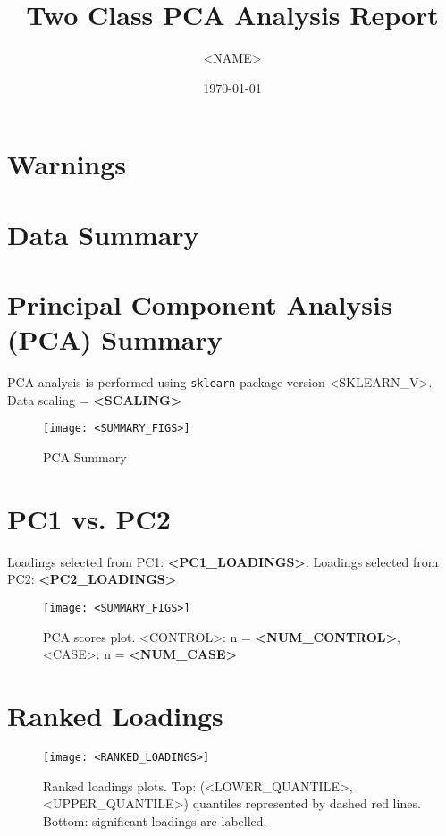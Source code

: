 \documentclass[]{article}
\title{Two Class PCA Analysis Report}
\author{<NAME>}
\date{\today}
\begin{document}
\begin{titlepage}
    \maketitle
    \section*{Warnings}
    \section*{Data Summary}
\end{titlepage}

\section*{Principal Component Analysis (PCA) Summary}
    PCA analysis is performed using \texttt{sklearn} package version <SKLEARN_V>. \\
    Data scaling = \textbf{<SCALING>}

    \begin{figure}[h!]
        \begin{center}
            \texttt{[image: <SUMMARY\_FIGS>]}    
        \end{center}
        \caption{PCA Summary}
    \end{figure}
    
\newpage

\section*{PC1 vs. PC2}
    Loadings selected from PC1: \textbf{<PC1_LOADINGS>}. Loadings selected from PC2: \textbf{<PC2_LOADINGS>} 

    \begin{figure}[h!]
        \begin{center}
            \texttt{[image: <SUMMARY\_FIGS>]}
        \end{center}
        \caption{PCA scores plot. <CONTROL>: n = \textbf{<NUM_CONTROL>}, <CASE>: n = \textbf{<NUM_CASE>}}
    \end{figure}

\newpage

\section*{Ranked Loadings}

    \begin{figure}[h!]
        \begin{center}
            \texttt{[image: <RANKED\_LOADINGS>]}
        \end{center}
        \caption{Ranked loadings plots. Top: (<LOWER_QUANTILE>, <UPPER_QUANTILE>) quantiles
        represented by dashed red lines. Bottom: significant loadings are labelled.}
    \end{figure}
\end{document}

